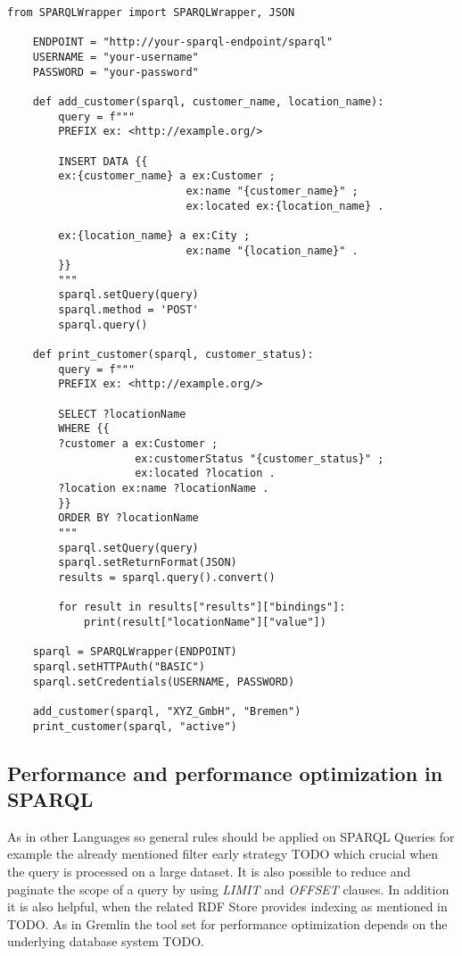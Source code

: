 \begin{lstlisting}[caption={Interact with SPARQL and Python}, label={lst:pythonSPARQL}]
	from SPARQLWrapper import SPARQLWrapper, JSON

	ENDPOINT = "http://your-sparql-endpoint/sparql"
	USERNAME = "your-username"
	PASSWORD = "your-password"

	def add_customer(sparql, customer_name, location_name):
		query = f"""
		PREFIX ex: <http://example.org/>

		INSERT DATA {{
		ex:{customer_name} a ex:Customer ;
							ex:name "{customer_name}" ;
							ex:located ex:{location_name} .
							
		ex:{location_name} a ex:City ;
							ex:name "{location_name}" .
		}}
		"""
		sparql.setQuery(query)
		sparql.method = 'POST'
		sparql.query()

	def print_customer(sparql, customer_status):
		query = f"""
		PREFIX ex: <http://example.org/>

		SELECT ?locationName
		WHERE {{
		?customer a ex:Customer ;
					ex:customerStatus "{customer_status}" ;
					ex:located ?location .
		?location ex:name ?locationName .
		}}
		ORDER BY ?locationName
		"""
		sparql.setQuery(query)
		sparql.setReturnFormat(JSON)
		results = sparql.query().convert()

		for result in results["results"]["bindings"]:
			print(result["locationName"]["value"])

	sparql = SPARQLWrapper(ENDPOINT)
	sparql.setHTTPAuth("BASIC")
	sparql.setCredentials(USERNAME, PASSWORD)

	add_customer(sparql, "XYZ_GmbH", "Bremen")
	print_customer(sparql, "active")
\end{lstlisting}

\subsection{Performance and performance optimization in SPARQL}
\label{subsec:different_query_languages_for_graph_databases:sparql:performance}
As in other Languages so general rules should be applied on SPARQL Queries for example
the already mentioned filter early strategy TODO which crucial when the query is 
processed on a large dataset. 
It is also possible to reduce and paginate the scope of a query by using \textit{LIMIT} and \textit{OFFSET}
clauses.
In addition it is also helpful, when the related RDF Store provides indexing as mentioned in TODO.
As in Gremlin the tool set for performance optimization depends on the 
underlying database system TODO.


